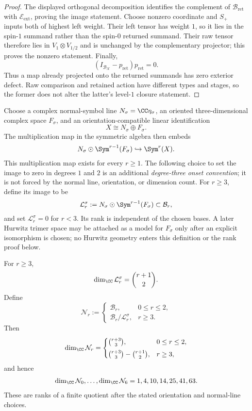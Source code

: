 \documentclass[11pt]{article}
\begin{document}
\begin{proof}
The displayed orthogonal decomposition identifies the complement of
\(\mathcal B_{\mathrm{ret}}\) with \(\mathcal E_{\mathrm{ext}}\), proving
the image statement.  Choose nonzero coordinate and \(S_+\) inputs both
of highest left weight.  Their left tensor has weight \(1\), so it lies
in the spin-\(1\) summand rather than the spin-\(0\) returned summand.
Their raw tensor therefore lies in \(V_1\otimes V_{1/2}\) and is unchanged
by the complementary projector; this proves the nonzero statement.
Finally,
\[
 (I_{\mathcal B_{\mathcal K}}-p_{\mathrm{ret}})p_{\mathrm{ret}}=0.
\]
Thus a map already projected onto the returned summands has zero exterior
defect.  Raw comparison and retained action have different types and stages,
so the former does not alter the latter's level-\(1\) closure statement.
\end{proof}

\begin{definition}
\label{p1:def:oriented-boundary-face}
Choose a complex normal-symbol line \(N_\sigma=\CC\eta_\sigma\), an oriented
three-dimensional complex space \(F_\sigma\), and an orientation-compatible
linear identification
\[
  X\cong N_\sigma\oplus F_\sigma.
\]
The multiplication map in the symmetric algebra then embeds
\[
  N_\sigma\odot\Sym^{r-1}(F_\sigma)
  \hookrightarrow\Sym^r(X).
\]
This multiplication map exists for every \(r\ge1\).  The following choice to
set the image to zero in degrees \(1\) and \(2\) is an additional
\emph{degree-three onset convention}; it is not forced by the normal line,
orientation, or dimension count.
For \(r\ge3\), define its image to be
\[
  \mathcal L_r^\sigma
  :=N_\sigma\odot\Sym^{r-1}(F_\sigma)
  \subset\mathcal B_r,
\]
and set \(\mathcal L_r^\sigma=0\) for \(r<3\).  Its rank is independent of
the chosen bases.  A later Hurwitz trimer space may be attached as a model for
\(F_\sigma\) only after an explicit isomorphism is chosen; no Hurwitz geometry
enters this definition or the rank proof below.
\end{definition}

\begin{theorem}
\label{p1:thm:boundary-reduced-ranks}
For \(r\ge3\),
\[
  \dim_\CC\mathcal L_r^\sigma=\binom{r+1}{2}.
\]
Define
\[
  \mathcal N_r:=
  \begin{cases}
    \mathcal B_r,&0\le r\le2,\\[2pt]
    \mathcal B_r/\mathcal L_r^\sigma,&r\ge3.
  \end{cases}
\]
Then
\[
  \dim_\CC\mathcal N_r=
  \begin{cases}
    \binom{r+3}{3},&0\le r\le2,\\[4pt]
    \binom{r+3}{3}-\binom{r+1}{2},&r\ge3,
  \end{cases}
\]
and hence
\[
  \dim_\CC\mathcal N_0,\ldots,\dim_\CC\mathcal N_6
  =1,4,10,14,25,41,63.
\]
These are ranks of a finite quotient after the stated orientation and
normal-line choices.
\end{theorem}
\end{document}
